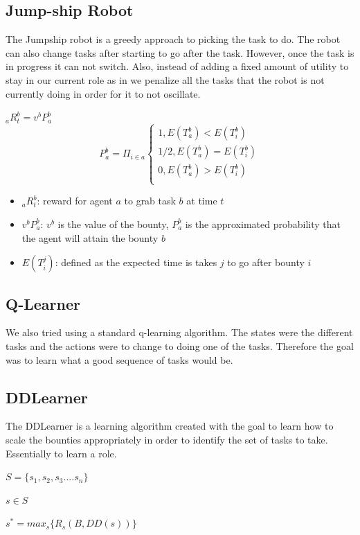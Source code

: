 \documentclass[twocolumn]{article}
\begin{document}
\subsection{Jump-ship Robot}
The Jumpship robot is a greedy approach to picking the task to do.  The robot can also change tasks after starting to go after the task.  However, once the task is in progress it can not switch.  Also, instead of adding a fixed amount of utility to stay in our current role as in \cite{Brusey2001} we penalize all the tasks that the robot is not currently doing in order for it to not oscillate.


$_aR_t^b = v^bP_a^b$
\[
P_a^b = \Pi_{i \in a} 
\begin{cases}
    1, E(T_a^b) <E(T_i^b)\\
    1/2, E(T_a^b) = E(T_i^b)\\
    0, E(T_a^b) >E(T_i^b)\\

\end{cases}
\]
\begin{itemize}
\item $_aR_t^b$: reward for agent $a$  to grab task $b$ at time $t$
\item $v^bP_a^b$: $v^b$ is the value of the bounty,  $P_a^b$ is the approximated probability that the agent will attain the bounty $b$ 
\item $E(T_i^j)$:  defined as the expected time is takes $j$ to go after bounty $i$
\end{itemize}

\subsection{Q-Learner}
We also tried using a standard q-learning algorithm.  The states were the different tasks and the actions were to change to doing one of the tasks.  Therefore the goal was to learn what a good sequence of tasks would be.
\subsection{DDLearner}
The DDLearner is a learning algorithm created with the goal to learn how to scale the bounties appropriately in order to identify the set of tasks to take.  Essentially to learn a role.  


$S = \{s_1,s_2,s_3....s_n\}$


$s \in S$


$s^* = max_s\{R_s(B,DD(s))\}$
\end{document}

